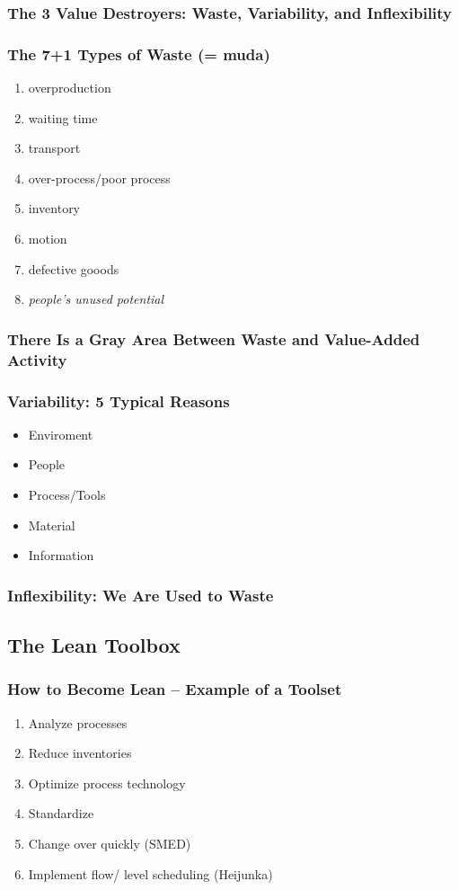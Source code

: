 \subsubsection{The 3 Value Destroyers: Waste, Variability, and Inflexibility }
\subsubsection{The 7+1 Types of Waste (= muda)}
\begin{enumerate}
\item overproduction
\item waiting time
\item transport
\item over-process/poor process
\item inventory
\item motion
\item defective gooods
\item \textit{people's unused potential}
\end{enumerate}
\subsubsection{There Is a Gray Area Between Waste and Value-Added Activity}
\subsubsection{Variability: 5 Typical Reasons}
\begin{itemize}
\item Enviroment
\item People
\item Process/Tools
\item Material
\item Information
\end{itemize}
\subsubsection{Inflexibility: We Are Used to Waste}
\subsection{The Lean Toolbox}
\subsubsection{How to Become Lean – Example of a Toolset}
\begin{enumerate}
	\item Analyze processes
	\item Reduce inventories 
	\item Optimize process technology
	\item Standardize
	\item Change over quickly (SMED)
	\item Implement flow/ level	scheduling (Heijunka)
\end{enumerate}
